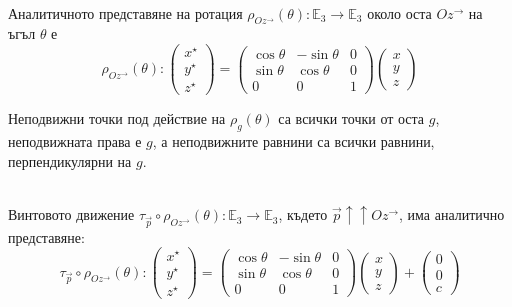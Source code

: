 \documentclass[12pt]{article}
\begin{document}
\\
\begin{tcolorbox}[
    colback=blue!5,    %
    colframe=blue!75!black, %
    title={\textbf{Твърдение 24:}}, %
    fonttitle=\bfseries,
    boxrule=0.8pt,
    arc=1mm,           %
    top=2mm, bottom=2mm, left=3mm, right=3mm
]  Аналитичното представяне на ротация $\rho_{Oz^{\rightarrow}}(\theta):\mathbb{E}_3\to\mathbb{E}_3$ около оста $Oz^{\rightarrow}$ на ъгъл $\theta$ е $$\rho_{Oz^{\rightarrow}}(\theta):\begin{pmatrix} x^\star \\ y^\star\\ z^\star\end{pmatrix}=\begin{pmatrix} \cos\theta & -\sin\theta & 0 \\ \sin\theta & \cos\theta & 0 \\ 0 & 0 & 1\end{pmatrix}\begin{pmatrix} x\\ y\\ z\end{pmatrix}$$
\end{tcolorbox}
Неподвижни точки под действие на $\rho_g(\theta)$ са всички точки от оста $g$, неподвижната права е $g$, а неподвижните равнини са всички равнини, перпендикулярни на $g$.
\\
\\
\begin{tcolorbox}[
    colback=blue!5,    %
    colframe=blue!75!black, %
    title={\textbf{Твърдение 25:}}, %
    fonttitle=\bfseries,
    boxrule=0.8pt,
    arc=1mm,           %
    top=2mm, bottom=2mm, left=3mm, right=3mm
] Винтовото движение $\tau_{\vec{p}}\circ\rho_{Oz^{\rightarrow}}(\theta):\mathbb{E}_3\to\mathbb{E}_3 $, където $\vec{p}\uparrow\uparrow Oz^{\rightarrow}$, има аналитично представяне: $$\tau_{\vec{p}}\circ\rho_{Oz^{\rightarrow}}(\theta):\begin{pmatrix} x^\star \\ y^\star\\ z^\star\end{pmatrix}=\begin{pmatrix} \cos\theta & -\sin\theta & 0 \\ \sin\theta & \cos\theta & 0 \\ 0 & 0 & 1\end{pmatrix}\begin{pmatrix} x\\ y\\ z\end{pmatrix}+\begin{pmatrix} 0 \\ 0 \\ c\end{pmatrix}$$
\end{tcolorbox}
\end{document}
